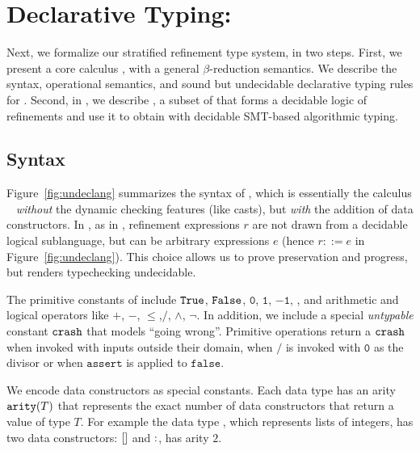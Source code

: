 \section{Declarative Typing: \texorpdfstring{\undeclang}{LamU}}\label{sec:language}\label{sec:undec}

Next, we formalize our stratified refinement type system, in two steps.
%
First,  we present a core calculus \undeclang, 
with a general $\beta$-reduction semantics. We describe the syntax,
operational semantics, and sound but undecidable declarative typing 
rules for \undeclang. 
%
Second, in , we describe \logiclang, a subset 
of \undeclang that forms a decidable logic of refinements and 
use it to obtain \declang with decidable SMT-based algorithmic typing.

\subsection{Syntax}\label{sec:undec:syntax} 



Figure~\ref{fig:undeclang} summarizes the syntax of \undeclang, 
which is essentially the calculus \hlang~\cite{Knowles10} 
\emph{without} the dynamic checking features (like casts), but 
\emph{with} the addition of data constructors.
%
In \undeclang, as in \hlang, refinement expressions $r$ are not drawn from a decidable 
logical sublanguage, but can be arbitrary expressions $e$
(hence $r ::= e$ in Figure~\ref{fig:undeclang}). 
This choice allows us to prove preservation and progress, 
but renders typechecking undecidable. 
 

The primitive constants of \undeclang include  
$\mathtt{True}$, $\mathtt{False}$, $\mathtt{0}$, $\mathtt{1}$, $\mathtt{-1}$, \etc,
and arithmetic and logical operators like $\mathtt{+}$, $\mathtt{-}$, 
$\mathtt{\leq}$,$\mathtt{/}$, $\mathtt{\land}$, $\mathtt{\lnot}$.
%
In addition, we include a special \emph{untypable} constant $\mathtt{crash}$ 
that models ``going wrong''. Primitive operations return a $\mathtt{crash}$
when invoked with inputs outside their domain, \eg when $\mathtt{/}$ 
is invoked with $\mathtt{0}$ as the divisor or when $\mathtt{assert}$ is 
applied to $\mathtt{false}$.

We encode data constructors as special constants. 
Each data type has an arity $\texttt{arity}(T)$ that represents
the exact number of data constructors that return a value of 
type $T$.
%
For example the data type \tintlist, which represents 
lists of integers, has two data constructors: $[]$ and $:$,
\ie has arity $2$.


